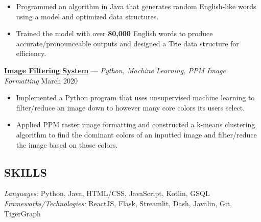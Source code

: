 \documentclass[11pt]{res}
\begin{document}
\begin{footnotesize}
\begin{resume}
\begin{itemize}
\item Programmed an algorithm in Java that generates random English-like words using a model and optimized data structures.  
\vspace{-2.75mm}
\item Trained the model with over \textbf{80,000} English words to produce accurate/pronounceable outputs and designed a Trie data structure for efficiency.
\end{itemize}
\vspace{-2.5mm}
\href{https://github.com/CharlesShi12/ImageFilters}{\textbf{Image Filtering System}} — {\sl Python, Machine Learning, PPM Image Formatting} \hfill March 2020\vspace{-4.75mm}
\begin{itemize} \itemsep -2pt
\item Implemented a Python program that uses unsupervised machine learning to filter/reduce an image down to however many core colors its users select.
\vspace{1mm}
\item Applied PPM raster image formatting and constructed a k-means clustering algorithm to find the dominant colors of an inputted image and filter/reduce the image based on those colors. 
\end{itemize}
\begin{small}
\section{SKILLS}
\end{small} 
\vspace{.5mm}
{\sl Languages:} 
Python, Java, HTML/CSS, JavaScript, Kotlin, GSQL \\
{\sl Frameworks/Technologies:} ReactJS, Flask, Streamlit, Dash, Javalin, Git, TigerGraph

\end{resume}
\end{footnotesize}
\end{document}
